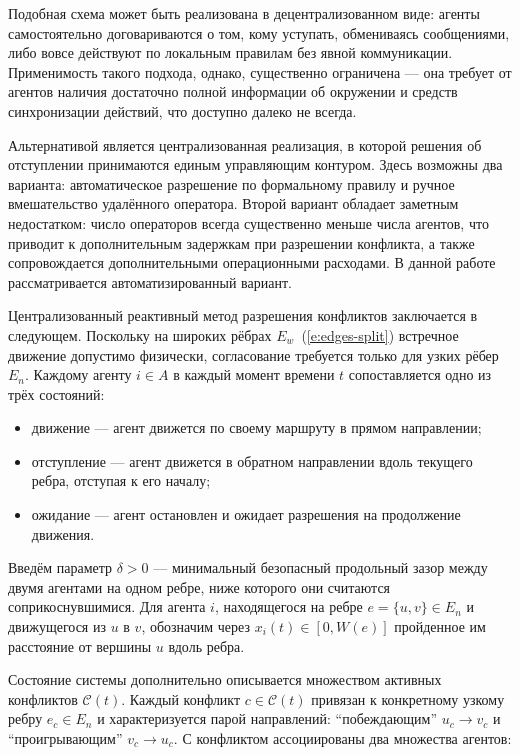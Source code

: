 Подобная схема может быть реализована в децентрализованном виде: агенты самостоятельно
договариваются о том, кому уступать, обмениваясь сообщениями, либо вовсе действуют по локальным
правилам без явной коммуникации. Применимость такого подхода, однако, существенно ограничена ---
она требует от агентов наличия достаточно полной информации об окружении и средств синхронизации
действий, что доступно далеко не всегда.

Альтернативой является централизованная реализация, в которой решения об отступлении принимаются
единым управляющим контуром. Здесь возможны два варианта: автоматическое разрешение по
формальному правилу и ручное вмешательство удалённого оператора. Второй вариант обладает заметным
недостатком: число операторов всегда существенно меньше числа агентов, что приводит к
дополнительным задержкам при разрешении конфликта, а также сопровождается дополнительными 
операционными расходами. В данной работе рассматривается автоматизированный
вариант.

Централизованный реактивный метод разрешения конфликтов заключается в следующем. Поскольку на широких рёбрах
$E_{w}$~(\ref{e:edges-split}) встречное движение допустимо физически, согласование требуется только
для узких рёбер $E_{n}$. Каждому агенту $i \in A$ в каждый момент времени $t$ сопоставляется одно
из трёх состояний:

\begin{itemize}
    \item движение --- агент движется по своему маршруту в прямом направлении;
    \item отступление --- агент движется в обратном направлении вдоль текущего ребра,
        отступая к его началу;
    \item ожидание --- агент остановлен и ожидает разрешения на
        продолжение движения.
\end{itemize}

Введём параметр $\delta > 0$ --- минимальный безопасный продольный зазор между двумя агентами на
одном ребре, ниже которого они считаются соприкоснувшимися. Для агента $i$, находящегося на ребре
$e = \{u, v\} \in E_{n}$ и движущегося из $u$ в $v$, обозначим через $x_i(t) \in [0, W(e)]$
пройденное им расстояние от вершины $u$ вдоль ребра.

Состояние системы дополнительно описывается множеством активных конфликтов $\mathcal{C}(t)$.
Каждый конфликт $c \in \mathcal{C}(t)$ привязан к конкретному узкому ребру $e_c \in E_{n}$ и
характеризуется парой направлений: \enquote{побеждающим} $u_c \to v_c$ и \enquote{проигрывающим}
$v_c \to u_c$. С конфликтом ассоциированы два множества агентов:

